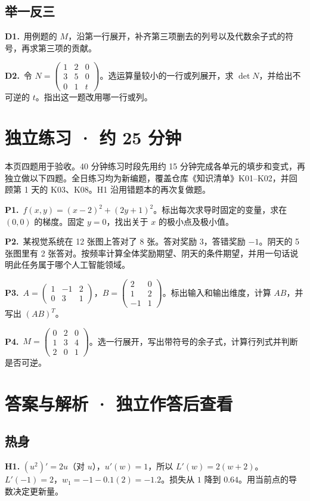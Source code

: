 \documentclass[UTF8,a4paper,11pt]{ctexart}
\newcommand{\CompactQuestion}[2]{\par\noindent\textbf{#1.}\ #2\par\vspace{.8em}}
\begin{document}
\subsection{举一反三}
\CompactQuestion{D1}{用例题的 $M$，沿第一行展开，补齐第三项删去的列号以及代数余子式的符号，再求第三项的贡献。}
\CompactQuestion{D2}{令 $N=\begin{pmatrix}1&2&0\\3&5&0\\0&1&t\end{pmatrix}$。选运算量较小的一行或列展开，求 $\det N$，并给出不可逆的 $t$。指出这一题改用哪一行或列。}
\clearpage
\section{独立练习 · 约 25 分钟}
本页四题用于验收。40 分钟练习时段先用约 15 分钟完成各单元的填步和变式，再独立做以下四题。全日练习均为新编题，覆盖仓库《知识清单》K01–K02，并回顾第 1 天的 K03、K08。H1 沿用错题本的再次复做题。

\CompactQuestion{P1}{$f(x,y)=(x-2)^2+(2y+1)^2$。标出每次求导时固定的变量，求在 $(0,0)$ 的梯度。固定 $y=0$，找出关于 $x$ 的极小点及极小值。}
\CompactQuestion{P2}{某视觉系统在 12 张图上答对了 8 张。答对奖励 3，答错奖励 $-1$。阴天的 5 张图里有 2 张答对。按频率计算全体奖励期望、阴天的条件期望，并用一句话说明此任务属于哪个人工智能领域。}
\CompactQuestion{P3}{$A=\begin{pmatrix}1&-1&2\\0&3&1\end{pmatrix}$，$B=\begin{pmatrix}2&0\\1&2\\-1&1\end{pmatrix}$。标出输入和输出维度，计算 $AB$，并写出 $(AB)^T$。}
\CompactQuestion{P4}{$M=\begin{pmatrix}0&2&0\\1&3&4\\2&0&1\end{pmatrix}$。选一行展开，写出带符号的余子式，计算行列式并判断是否可逆。}
\clearpage
\section{答案与解析 · 独立作答后查看}
\subsection{热身}
\textbf{H1.} $(u^2)'=2u$（对 $u$），$u'(w)=1$，所以 $L'(w)=2(w+2)$。$L'(-1)=2$，$w_1=-1-0.1(2)=-1.2$。损失从 $1$ 降到 $0.64$。用当前点的导数决定更新量。
\end{document}
